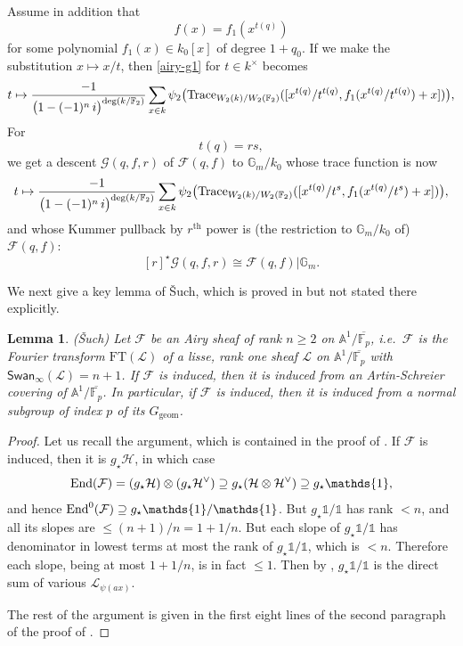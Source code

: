 \documentclass[11pt]{amsart}
\theoremstyle{plain}
\newtheorem{lem}[thm]{Lemma}
\theoremstyle{definition}
\numberwithin{thm}{section}
\numberwithin{equation}{thm}
\newcommand{\End}{{\rm End}}
\newcommand{\Trace}{{\rm Trace}}
\newcommand{\Swan}{\mathsf {Swan}}
\newcommand{\sF}{{\mathcal F}}
\newcommand{\sG}{{\mathcal G}}
\newcommand{\sH}{{\mathcal H}}
\newcommand{\sL}{{\mathcal L}}
\newcommand{\A}{{\mathbb A}}
\newcommand{\F}{{\mathbb F}}
\newcommand{\G}{{\mathbb G}}
\newcommand{\0}{\emptyset}
\newcommand{\ari}{{\mathrm {arith}}}
\newcommand{\geo}{{\mathrm {geom}}}
\newcommand{\triv}{{\mathds{1}}}
\newcommand{\FT}{\mathrm{FT}}
\begin{document}
Assume in addition that 
\begin{equation}\label{airy-s}
  f(x) =f_1(x^{t(q)})
\end{equation}
for some polynomial $f_1(x)\in k_0[x]$ of degree $1+q_0$. If we make the substitution $x \mapsto x/t$, then 
\eqref{airy-g1} for $t \in k^\times$ becomes
$$t \mapsto \frac{-1}{\bigl(1-(-1)^n\,i\bigr)^{\deg(k/\F_2)}}\sum_{x \in k}\psi_2\bigl(\Trace_{W_2(k)/W_2(\F_2)}([x^{t(q)}/t^{t(q)},f_1(x^{t(q)}/t^{t(q)})+x])\bigr),$$
For $$t(q)=rs,$$
we get a descent $\sG(q,f,r)$ of $\sF(q,f)$ to $\G_m/k_0$ whose trace function is now
$$t \mapsto \frac{-1}{\bigl(1-(-1)^n\,i\bigr)^{\deg(k/\F_2)}}\sum_{x \in k}\psi_2\bigl(\Trace_{W_2(k)/W_2(\F_2)}([x^{t(q)}/t^s,f_1(x^{t(q)}/t^s)+x])\bigr),$$
and whose Kummer pullback by $r^{\mathrm {th}}$ power  is (the restriction to $\G_m/k_0$ of) $\sF(q,f)$:
$$[r]^\star\sG(q,f,r) \cong \sF(q,f)|\G_m.$$



We next give a key lemma of {\rm \v{S}uch}, which is proved in \cite[Proposition 11.1]{Such} but not stated there explicitly.
\begin{lem} {\rm (\v{S}uch)} \label{ASinduced}
Let $\sF$ be an Airy sheaf of rank $n \ge 2$ on $\A^1/\overline{\F_p}$, i.e.\ $\sF$ is the Fourier transform $\FT(\sL)$ of a lisse, rank
one sheaf $\sL$ on $\A^1/\overline{\F_p}$ with $\Swan_\infty(\sL)=n+1$. If $\sF$ is induced, then it is induced from an Artin-Schreier covering of $\A^1/\overline{\F_p}$. In particular, if $\sF$ is induced,  then 
it is induced from a normal subgroup of index $p$ of its $G_{\geo}$.
\end{lem}
\begin{proof}
Let us recall the argument, which is contained in the proof of \cite[Proposition 11.1]{Such}. If $\sF$ is induced, then it is $g_\star \sH$, in which case 
$$\End(\sF)=(g_\star \sH)\otimes (g_\star \sH^\vee) \supseteq g_\star(\sH\otimes \sH^\vee) \supseteq g_\star\triv,$$
and hence $\End^0(\sF) \supseteq g_\star\triv/\triv$. But $g_\star\triv/\triv$ has rank $<n$, and all its slopes are $\le (n+1)/n = 1 + 1/n$. But each slope of 
 $g_\star\triv/\triv$ has denominator in lowest terms at most the rank of $g_\star\triv/\triv$, which is $< n$. Therefore each slope, being at most
 $1 + 1/n$, is in fact $\le 1$. Then by \cite[Corollary 3.3]{Such}, $g_\star\triv/\triv$ is the direct sum of various $\sL_{\psi(ax)}$.
 
 
The rest of the argument
is given in the first eight lines of the second paragraph of the proof of \cite[Proposition 11.1]{Such}.
\end{proof}
\end{document}
